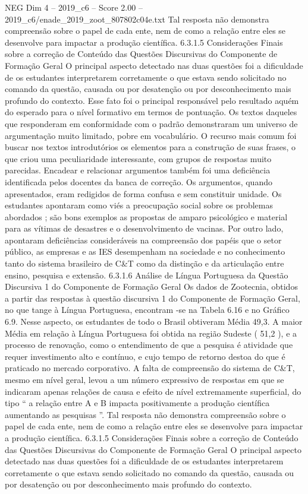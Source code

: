 \begin{textsample}{NEG Dim 4 – 2019\_c6 – Score 2.00 – 2019\_c6/enade\_2019\_zoot\_807802c04e.txt}
Tal resposta não demonstra compreensão sobre o papel de cada ente, nem de como a relação entre eles se desenvolve para impactar a produção científica. 6.3.1.5 Considerações Finais sobre a correção de Conteúdo das Questões Discursivas do Componente de Formação Geral O principal aspecto detectado nas duas questões foi a dificuldade de os estudantes interpretarem corretamente o que estava sendo solicitado no comando da questão, causada ou por desatenção ou por desconhecimento mais profundo do contexto.
Esse fato foi o principal responsável pelo resultado aquém do esperado para o nível formativo em termos de pontuação.
Os textos daqueles que responderam em conformidade com o padrão demonstraram um universo de argumentação muito limitado, pobre em vocabulário.
O recurso mais comum foi buscar nos textos introdutórios os elementos para a construção de suas frases, o que criou uma peculiaridade interessante, com grupos de respostas muito parecidas.
Encadear e relacionar argumentos também foi uma deficiência identificada pelos docentes da banca de correção.
Os argumentos, quando apresentados, eram redigidos de forma confusa e sem constituir unidade.
Os estudantes apontaram como viés a preocupação social sobre os problemas abordados ; são bons exemplos as propostas de amparo psicológico e material para as vítimas de desastres e o desenvolvimento de vacinas.
Por outro lado, apontaram deficiências consideráveis na compreensão dos papéis que o setor público, as empresas e as IES desempenham na sociedade e no conhecimento tanto do sistema brasileiro de C\&T como da distinção e da articulação entre ensino, pesquisa e extensão. 6.3.1.6 Análise de Língua Portuguesa da Questão Discursiva 1 do Componente de Formação Geral Os dados de Zootecnia, obtidos a partir das respostas à questão discursiva 1 do Componente de Formação Geral, no que tange à Língua Portuguesa, encontram -se na Tabela 6.16 e no Gráfico 6.9.
Nesse aspecto, os estudantes de todo o Brasil obtiveram Média 49,3.
A maior Média em relação à Língua Portuguesa foi obtida na região Sudeste ( 51,2 ), e a processo de renovação, como o entendimento de que a pesquisa é atividade que requer investimento alto e contínuo, e cujo tempo de retorno destoa do que é praticado no mercado corporativo.
A falta de compreensão do sistema de C\&T, mesmo em nível geral, levou a um número expressivo de respostas em que se indicaram apenas relações de causa e efeito de nível extremamente superficial, do tipo “ a relação entre A e B impacta positivamente a produção científica aumentando as pesquisas ”.
Tal resposta não demonstra compreensão sobre o papel de cada ente, nem de como a relação entre eles se desenvolve para impactar a produção científica. 6.3.1.5 Considerações Finais sobre a correção de Conteúdo das Questões Discursivas do Componente de Formação Geral O principal aspecto detectado nas duas questões foi a dificuldade de os estudantes interpretarem corretamente o que estava sendo solicitado no comando da questão, causada ou por desatenção ou por desconhecimento mais profundo do contexto.

\end{textsample}
